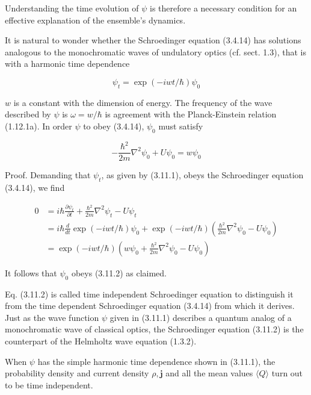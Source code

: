 \documentclass{article}
\begin{document}
Understanding the time evolution of $\psi$ is therefore a necessary condition for an effective explanation of the ensemble's dynamics.

It is natural to wonder whether the Schroedinger equation (3.4.14) has solutions analogous to the monochromatic waves of undulatory optics (cf. sect. 1.3), that is with a harmonic time dependence
 
\begin{equation*}
\psi_{t}=\exp (-i w t / \hbar) \psi_{0} \tag{3.11.1}
\end{equation*}
 
$w$ is a constant with the dimension of energy. The frequency of the wave described by $\psi$ is $\omega=w / \hbar$ is agreement with the Planck-Einstein relation (1.12.1a). In order $\psi$ to obey (3.4.14), $\psi_{0}$ must satisfy
 
\begin{equation*}
-\frac{\hbar^{2}}{2 m} \nabla^{2} \psi_{0}+U \psi_{0}=w \psi_{0} \tag{3.11.2}
\end{equation*}
 

Proof. Demanding that $\psi_{t}$, as given by (3.11.1), obeys the Schroedinger equation (3.4.14), we find
 
\begin{align*}
0 & =i \hbar \frac{\partial \psi_{t}}{\partial t}+\frac{\hbar^{2}}{2 m} \nabla^{2} \psi_{t}-U \psi_{t}  \tag{3.11.3}\\
& =i \hbar \frac{d}{d t} \exp (-i w t / \hbar) \psi_{0}+\exp (-i w t / \hbar)\left(\frac{\hbar^{2}}{2 m} \nabla^{2} \psi_{0}-U \psi_{0}\right) \\
& =\exp (-i w t / \hbar)\left(w \psi_{0}+\frac{\hbar^{2}}{2 m} \nabla^{2} \psi_{0}-U \psi_{0}\right)
\end{align*}
 

It follows that $\psi_{0}$ obeys (3.11.2) as claimed.

Eq. (3.11.2) is called time independent Schroedinger equation to distinguish it from the time dependent Schroedinger equation (3.4.14) from which it derives. Just as the wave function $\psi$ given in (3.11.1) describes a quantum analog of a monochromatic wave of classical optics, the Schroedinger equation (3.11.2) is the counterpart of the Helmholtz wave equation (1.3.2).

When $\psi$ has the simple harmonic time dependence shown in (3.11.1), the probability density and current density $\rho, \boldsymbol{j}$ and all the mean values $\langle Q\rangle$ turn out to be time independent.
\end{document}
